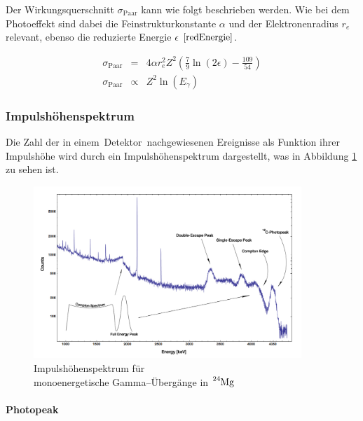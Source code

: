 \documentclass[12pt,a4paper]{scrartcl}
\numberwithin{equation}{section} %
\begin{document}
Der Wirkungsquerschnitt $\sigma_\mathrm{Paar}$ kann wie folgt beschrieben werden. Wie bei dem Photoeffekt sind dabei die Feinstrukturkonstante $\alpha$ und der Elektronenradius $r_e$ relevant, ebenso die reduzierte Energie $\epsilon$ $\eqref{redEnergie}$.

\begin{eqnarray}
    \sigma_\mathrm{Paar}
        &=& 4\alpha r_e^2 Z^2
            \left(\frac{7}{9} \ln(2\epsilon) - \frac{109}{54} \right) \\
    \sigma_\mathrm{Paar}
        &\propto& Z^2 \ln(E_\gamma)
\end{eqnarray}

\hypertarget{impulshuxf6henspektrum}{%
\subsubsection{Impulshöhenspektrum}\label{impulshuxf6henspektrum}}

Die Zahl der in einem~Detektor~nachgewiesenen Ereignisse als Funktion ihrer Impulshöhe wird durch ein Impulshöhenspektrum dargestellt, was in Abbildung \ref{abb:Impulshoehenspektrum} zu sehen ist. \cite{Impulshöhenspektrum}

\begin{figure}[h]
	\centering
	\includegraphics[width=0.9\textwidth]{../media/B3.4/Am_Be_SourceSpectrum.jpg}
	\caption{Impulshöhenspektrum für \\
		monoenergetische Gamma--Übergänge in $\ce{^{24}Mg}$  \cite{abb:Spektrum}}
	\label{abb:Impulshoehenspektrum}
\end{figure}

\paragraph{Photopeak}
\end{document}
